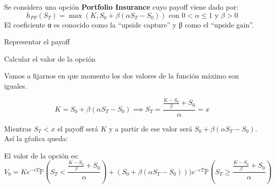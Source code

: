 \begin{problem}[6]
Se considera una opción \textbf{Portfolio Insurance} cuyo payoff viene dado por:
\[h_{PF}(S_T) = \max(K,S_0 + β(αS_T-S_0)) \text{ con } 0 < α \leq 1 \text{ y } β > 0\]
El coeficiente α es conocido como la ``upside capture'' y β como el ``upside gain''.

\ppart Representar el payoff

\ppart Calcular el valor de la opción

\solution
{}

\spart

Vamos a fijarnos en que momento los dos valores de la función máximo son iguales.

\[K=S_0 + β(αS_T-S_0) \implies S_T = \frac{\frac{K-S_0}{β}+S_0}{α} = x\]

Mientras $S_T < x$ el payoff será $K$ y a partir de ese valor será $S_0 + β(αS_T-S_0)$. Así la gŕafica queda:
\begin{center}
\end{center}

El valor de la opción es:
\[V_0 = Ke^{-rT}\mathbb{P}\left(S_T < \frac{\frac{K-S_0}{β}+S_0}{α}\right) + (S_0 + β(αS_T-S_0)))e^{-rT}\mathbb{P}\left(S_T \geq \frac{\frac{K-S_0}{β}+S_0}{α}\right) \]

\end{problem}

